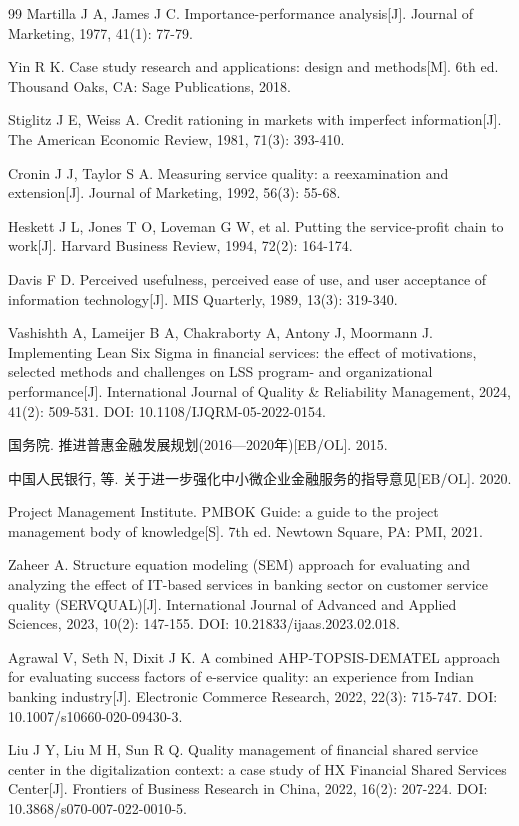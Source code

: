 \begin{thebibliography}{99}
 Martilla J A, James J C. Importance-performance analysis[J]. Journal of Marketing, 1977, 41(1): 77-79.

 Yin R K. Case study research and applications: design and methods[M]. 6th ed. Thousand Oaks, CA: Sage Publications, 2018.

 Stiglitz J E, Weiss A. Credit rationing in markets with imperfect information[J]. The American Economic Review, 1981, 71(3): 393-410.

 Cronin J J, Taylor S A. Measuring service quality: a reexamination and extension[J]. Journal of Marketing, 1992, 56(3): 55-68.

 Heskett J L, Jones T O, Loveman G W, et al. Putting the service-profit chain to work[J]. Harvard Business Review, 1994, 72(2): 164-174.

 Davis F D. Perceived usefulness, perceived ease of use, and user acceptance of information technology[J]. MIS Quarterly, 1989, 13(3): 319-340.

 Vashishth A, Lameijer B A, Chakraborty A, Antony J, Moormann J. Implementing Lean Six Sigma in financial services: the effect of motivations, selected methods and challenges on LSS program- and organizational performance[J]. International Journal of Quality \& Reliability Management, 2024, 41(2): 509-531. DOI: 10.1108/IJQRM-05-2022-0154.

 国务院. 推进普惠金融发展规划(2016—2020年)[EB/OL]. 2015.

 中国人民银行, 等. 关于进一步强化中小微企业金融服务的指导意见[EB/OL]. 2020.

 Project Management Institute. PMBOK Guide: a guide to the project management body of knowledge[S]. 7th ed. Newtown Square, PA: PMI, 2021.

 Zaheer A. Structure equation modeling (SEM) approach for evaluating and analyzing the effect of IT-based services in banking sector on customer service quality (SERVQUAL)[J]. International Journal of Advanced and Applied Sciences, 2023, 10(2): 147-155. DOI: 10.21833/ijaas.2023.02.018.

 Agrawal V, Seth N, Dixit J K. A combined AHP-TOPSIS-DEMATEL approach for evaluating success factors of e-service quality: an experience from Indian banking industry[J]. Electronic Commerce Research, 2022, 22(3): 715-747. DOI: 10.1007/s10660-020-09430-3.

 Liu J Y, Liu M H, Sun R Q. Quality management of financial shared service center in the digitalization context: a case study of HX Financial Shared Services Center[J]. Frontiers of Business Research in China, 2022, 16(2): 207-224. DOI: 10.3868/s070-007-022-0010-5.

\end{thebibliography}